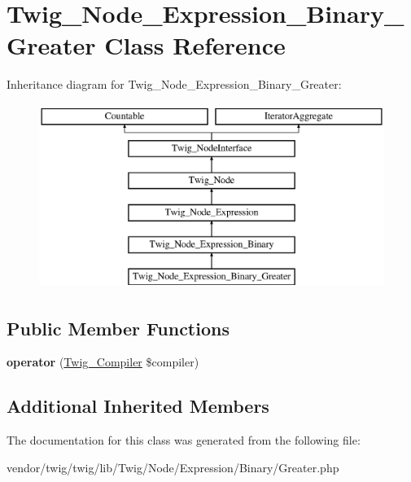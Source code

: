 \hypertarget{classTwig__Node__Expression__Binary__Greater}{}\section{Twig\+\_\+\+Node\+\_\+\+Expression\+\_\+\+Binary\+\_\+\+Greater Class Reference}
\label{classTwig__Node__Expression__Binary__Greater}
Inheritance diagram for Twig\+\_\+\+Node\+\_\+\+Expression\+\_\+\+Binary\+\_\+\+Greater\+:\begin{figure}[H]
\begin{center}
\leavevmode
\includegraphics[height=6.000000cm]{classTwig__Node__Expression__Binary__Greater}
\end{center}
\end{figure}
\subsection*{Public Member Functions}
\begin{DoxyCompactItemize}
\item 
{\bfseries operator} (\hyperlink{classTwig__Compiler}{Twig\+\_\+\+Compiler} \$compiler)\hypertarget{classTwig__Node__Expression__Binary__Greater_ad37552d34aa73f0f1a5f83efe8a6e0ce}{}\label{classTwig__Node__Expression__Binary__Greater_ad37552d34aa73f0f1a5f83efe8a6e0ce}

\end{DoxyCompactItemize}
\subsection*{Additional Inherited Members}


The documentation for this class was generated from the following file\+:\begin{DoxyCompactItemize}
\item 
vendor/twig/twig/lib/\+Twig/\+Node/\+Expression/\+Binary/Greater.\+php\end{DoxyCompactItemize}
